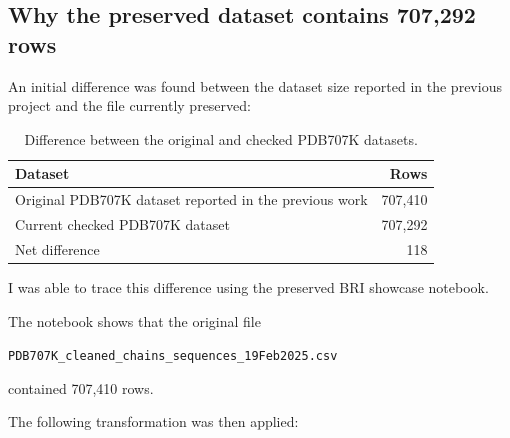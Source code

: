 \documentclass[11pt,a4paper]{article}
\begin{document}
\subsection{Why the preserved dataset contains 707,292 rows}

An initial difference was found between the dataset size reported in the previous project and the file currently preserved:

\begin{table}[h]
\centering
\begin{tabular}{lr}
\toprule
\textbf{Dataset} & \textbf{Rows} \\
\midrule
Original PDB707K dataset reported in the previous work & 707,410 \\
Current checked PDB707K dataset & 707,292 \\
Net difference & 118 \\
\bottomrule
\end{tabular}
\caption{Difference between the original and checked PDB707K datasets.}
\end{table}

I was able to trace this difference using the preserved BRI showcase notebook.

The notebook shows that the original file

\begin{center}
\texttt{PDB707K\_cleaned\_chains\_sequences\_19Feb2025.csv}
\end{center}

contained 707,410 rows.

The following transformation was then applied:
\end{document}
